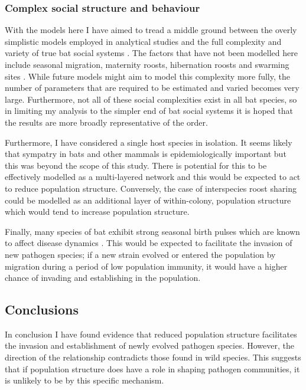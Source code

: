 \subsubsection{Complex social structure and behaviour}

With the models here I have aimed to tread a middle ground between the overly simplistic models employed in analytical studies \cite{allen2004sis} and the full complexity and variety of true bat social systems \cite{kerth2008causes}.
The factors that have not been modelled here include seasonal migration,  maternity roosts, hibernation roosts and swarming sites \cite{kerth2008causes, fleming2003ecology, richter2008first, cryan2014continental}. 
While future models might aim to model this complexity more fully, the number of parameters that are required to be estimated and varied becomes very large.
Furthermore, not all of these social complexities exist in all bat species, so in limiting my analysis to the simpler end of bat social systems it is hoped that the results are more broadly representative of the order.

Furthermore, I have considered a single host species in isolation.
It seems likely that sympatry in bats and other mammals is epidemiologically important \cite{brierley2016quantifying, luis2013comparison, pilosof2015potential} but this was beyond the scope of this study.
There is potential for this to be effectively modelled as a multi-layered network \cite{wang2016structural, funk2010interacting} and this would be expected to act to reduce population structure.
Conversely, the case of interspecies roost sharing could be modelled as an additional layer of within-colony, population structure which would tend to increase population structure.

Finally, many species of bat exhibit strong seasonal birth pulses which are known to affect disease dynamics \cite{hayman2015biannual,peel2014effect,amman2012seasonal}.
This would be expected to facilitate the invasion of new pathogen species; if a new strain evolved or entered the population by migration during a period of low population immunity, it would have a higher chance of invading and establishing in the population.

\subsection{Conclusions}

In conclusion I have found evidence that reduced population structure facilitates the invasion and establishment of newly evolved pathogen species.
However, the direction of the relationship contradicts those found in wild species.
This suggests that if population structure does have a role in shaping pathogen communities, it is unlikely to be by this specific mechanism.






